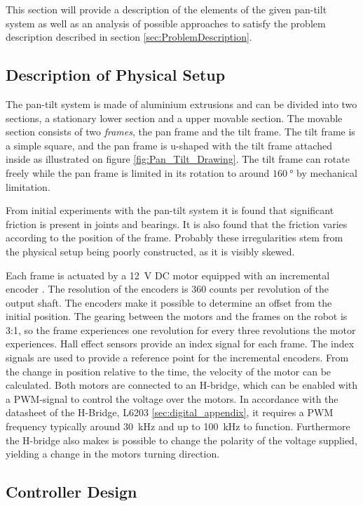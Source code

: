 \documentclass[../../main.tex]{subfiles}
\begin{document}
This section will provide a description of the elements of the given pan-tilt system as well as an analysis of possible approaches to satisfy the problem description described in section \ref{sec:ProblemDescription}.

\subsection{Description of Physical Setup}
The pan-tilt system is made of aluminium extrusions and can be divided into two sections, a stationary lower section and a upper movable section. The movable section consists of two \textit{frames}, the pan frame and the tilt frame. The tilt frame is a simple square, and the pan frame is u-shaped with the tilt frame attached inside as illustrated on figure \ref{fig:Pan_Tilt_Drawing}. The tilt frame can rotate freely while the pan frame is limited in its rotation to around $\SI{160}{\degree}$ by mechanical limitation.

From initial experiments with the pan-tilt system it is found that significant friction is present in joints and bearings. It is also found that the friction varies according to the position of the frame. Probably these irregularities stem from the physical setup being poorly constructed, as it is visibly skewed.  

Each frame is actuated by a \SI{12}{\volt} DC motor equipped with an incremental encoder \cite{}. The resolution of the encoders is 360 counts per revolution of the output shaft. The encoders make it possible to determine an offset from the initial position. The gearing between the motors and the frames on the robot is 3:1, so the frame experiences one revolution for every three revolutions the motor experiences. Hall effect sensors \cite{} provide an index signal for each frame. The index signals are used to provide a reference point for the incremental encoders. From the change in position relative to the time, the velocity of the motor can be calculated. Both motors are connected to an H-bridge, which can be enabled with a PWM-signal to control the voltage over the motors. In accordance with the datasheet of the H-Bridge, L6203 \cite{} \ref{sec:digital_appendix}, it requires a PWM frequency typically around \SI{30}{\kilo\hertz} and up to \SI{100}{\kilo\hertz} to function. Furthermore the H-bridge also makes is possible to change the polarity of the voltage supplied, yielding a change in the motors turning direction.

\subsection{Controller Design}
\end{document}
